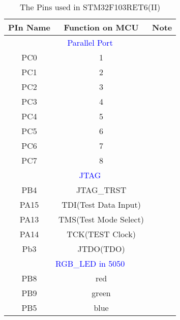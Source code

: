 \begin{table}[!htd]
\begin{center}
\caption{The Pins used in STM32F103RET6(II)  \label{PinUsedWirelessTrigger2}}
\noindent\begin{tabular}{|c|c|c|}
\hline
\textbf{PIn Name} & \textbf{Function on MCU}  & {\bfseries Note}  \\ \hline
\multicolumn{3}{|c|}{\textcolor{blue}{Parallel Port}}  \\ \hline
PC0	& 	1	&\rule{0pt}{1ex} \\ \hline
PC1	&	2  	&\rule{0pt}{1ex} \\ \hline
PC2	&	3	&\rule{0pt}{1ex} \\ \hline
PC3	&	4	&\rule{0pt}{1ex} \\ \hline
PC4	&	5	&\rule{0pt}{1ex} \\ \hline
PC5	&	6	&\rule{0pt}{1ex} \\ \hline
PC6	&	7	&\rule{0pt}{1ex} \\ \hline
PC7	&	8	&\rule{0pt}{1ex} \\ \hline
\multicolumn{3}{|c|}{\textcolor{blue}{JTAG}}  \\ \hline
PB4	&	JTAG\_{}TRST	&\rule{0pt}{1ex} \\ \hline
PA15	&	TDI(Test Data Input)	&\rule{0pt}{1ex} \\ \hline
PA13	&	TMS(Test Mode Select)	&\rule{0pt}{1ex} \\ \hline
PA14	&	TCK(TEST Clock)	&\rule{0pt}{1ex} \\ \hline
Pb3	&	JTDO(TDO)	&\rule{0pt}{1ex} \\ \hline
\multicolumn{3}{|c|}{\textcolor{blue}{RGB\_{}LED in 5050}}  \\ \hline
PB8	&	red	&\rule{0pt}{1ex} \\ \hline
PB9	&	green	&\rule{0pt}{1ex} \\ \hline
PB5	&	blue	&\rule{0pt}{1ex} \\ \hline
\end{tabular}
\end{center}
\end{table}

\listoffigures
\listoftables


